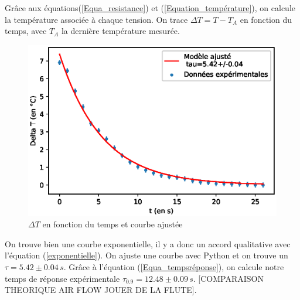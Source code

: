 \documentclass[12pt]{article}
\begin{document}
\newpage
Grâce aux équations(\ref{Equa_resistance}) et (\ref{Equation_température}), on calcule la température associée à chaque tension. On trace $\Delta T=T-T_A$ en fonction du temps, avec $T_A$ la dernière température mesurée.

\begin{figure}[h!]
	\begin{center}
		\includegraphics[scale=0.7]{Tempscara.eps}
		\caption{$\Delta T$ en fonction du temps et courbe ajustée}
		\label{Temps_caractéristique}
	\end{center}
\end{figure}

On trouve bien une courbe exponentielle, il y a donc un accord qualitative avec l'équation (\ref{exponentielle}). On ajuste une courbe avec Python et on trouve un $\tau = 5.42\pm 0.04\,s$. Grâce à l'équation (\ref{Equa_tempsréponse}), on calcule notre temps de réponse expérimentale $\tau_{0.9}=12.48\pm 0.09\,s$. [COMPARAISON THEORIQUE AIR FLOW JOUER DE LA FLUTE].
\end{document}
